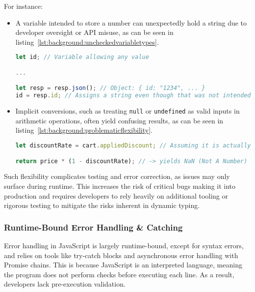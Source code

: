 For instance:

\begin{itemize}
	\item{
		A variable intended to store a number can unexpectedly hold a string due to developer oversight or API misuse, as can be seen in listing~\ref{lst:background:uncheckedvariabletypes}.

		\begin{lstlisting}[language=JavaScript,caption=Unchecked variable assignments due to missing type definitions,label=lst:background:uncheckedvariabletypes]
let id; // Variable allowing any value

...

let resp = resp.json(); // Object: { id: "1234", ... }
id = resp.id; // Assigns a string even though that was not intended
		\end{lstlisting}
	}
	\item{
		Implicit conversions, such as treating \lstinline|null| or \lstinline|undefined| as valid inputs in arithmetic operations, often yield confusing results, as can be seen in listing~\ref{lst:background:problematicflexibility}.

		\begin{lstlisting}[language=JavaScript,caption=Broad ability to perform "invalid" operations despite clear error case,label=lst:background:problematicflexibility]
let discountRate = cart.appliedDiscount; // Assuming it is actually "applied_discount" not "appliedDiscount" so it returns "undefined"

return price * (1 - discountRate); // -> yields NaN (Not A Number)
		\end{lstlisting}
	}
\end{itemize}

Such flexibility complicates testing and error correction, as issues may only surface during runtime. This increases the risk of critical bugs making it into production and requires developers to rely heavily on additional tooling or rigorous testing to mitigate the risks inherent in dynamic typing.

\subsubsection{Runtime-Bound Error Handling \& Catching}

Error handling in JavaScript is largely runtime-bound, except for syntax errors, and relies on tools like try-catch blocks and asynchronous error handling with Promise chains. This is because JavaScript is an interpreted language, meaning the program does not perform checks before executing each line. As a result, developers lack pre-execution validation.

